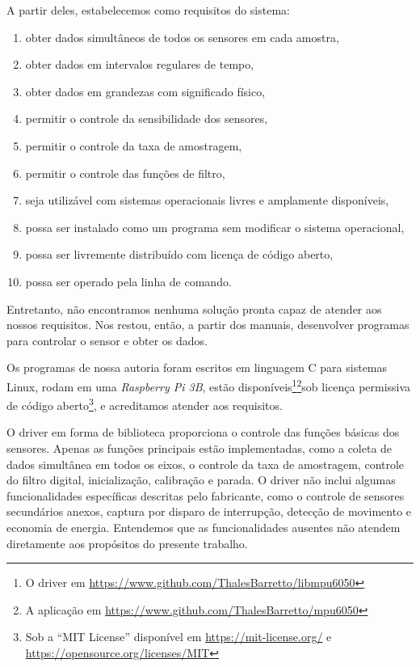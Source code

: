 A partir deles, estabelecemos como requisitos do sistema:
\begin{enumerate}
        \item obter dados simultâneos de todos os sensores em cada amostra,
        \item obter dados em intervalos regulares de tempo,
        \item obter dados em grandezas com significado físico,
        \item permitir o controle da sensibilidade dos sensores,
        \item permitir o controle da taxa de amostragem,
        \item permitir o controle das funções de filtro,
        \item seja utilizável com sistemas operacionais livres e amplamente disponíveis,
        \item possa ser instalado como um programa sem modificar o sistema operacional,
        \item possa ser livremente distribuído com licença de código aberto,
        \item possa ser operado pela linha de comando.
\end{enumerate}

Entretanto, não encontramos nenhuma solução pronta capaz de atender aos nossos requisitos. Nos restou, então, a partir dos manuais, desenvolver programas para controlar o sensor e obter os dados.

Os programas de nossa autoria foram escritos em linguagem C para sistemas Linux, rodam em uma \emph{Raspberry Pi 3B}, estão disponíveis\footnote{O driver em \href{https://www.github.com/ThalesBarretto/libmpu6050}{https://www.github.com/ThalesBarretto/libmpu6050}}\footnote{A aplicação em \href{https://www.github.com/ThalesBarretto/mpu6050}{https://www.github.com/ThalesBarretto/mpu6050}}sob licença permissiva de código aberto\footnote{Sob a ``MIT License'' disponível em \href{https://mit-license.org/}{https://mit-license.org/} e \href{https://opensource.org/licenses/MIT}{https://opensource.org/licenses/MIT}}, e acreditamos atender aos requisitos.

O driver em forma de biblioteca proporciona o controle das funções básicas dos sensores. Apenas as funções principais estão implementadas, como a coleta de dados simultânea em todos os eixos, o controle da taxa de amostragem, controle do filtro digital, inicialização, calibração e parada. O driver não inclui algumas funcionalidades específicas descritas pelo fabricante, como o controle de sensores secundários anexos, captura por disparo de interrupção, detecção de movimento e economia de energia. Entendemos que as funcionalidades ausentes não atendem diretamente aos propósitos do presente trabalho.

